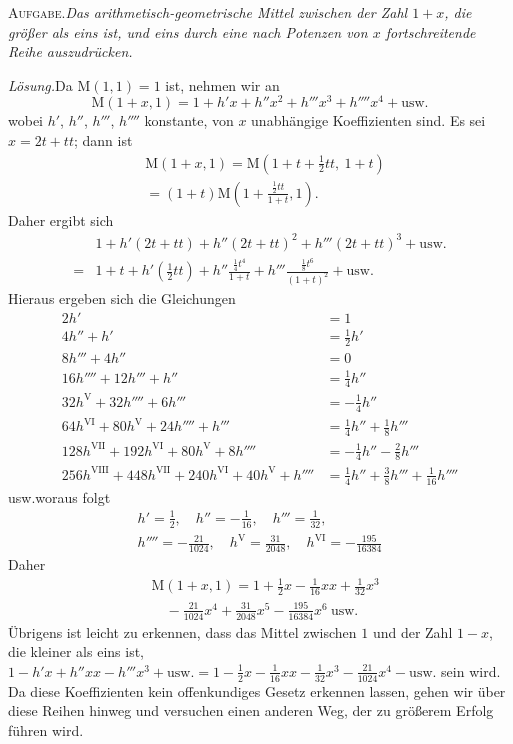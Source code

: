 \begingroup
\renewcommand{\arraystretch}{1.45}

\textsc{Aufgabe.}\quad \textit{Das arithmetisch-geometrische Mittel zwischen der Zahl $1+x$, die größer als eins ist, und eins durch eine nach Potenzen von $x$ fortschreitende Reihe auszudrücken.}

\textit{Lösung.}\quad Da $\mathrm M(1,1)=1$ ist, nehmen wir an
\[
\mathrm M(1+x,1)=1+h'x+h''x^2+h'''x^3+h''''x^4+\text{usw.}
\]
wobei $h'$, $h''$, $h'''$, $h''''$ konstante, von $x$ unabhängige Koeffizienten sind.
Es sei $x=2t+tt$; dann ist
\[
\begin{aligned}&\mathrm M(1+x,1)=\mathrm M(1+t+\tfrac12tt,\ 1+t)\\&=(1+t)\mathrm M(1+\frac{\tfrac12tt}{1+t},1).\end{aligned}
\]
Daher ergibt sich
\[
\begin{aligned}
&1+h'(2t+tt)+h''(2t+tt)^2+h'''(2t+tt)^3+\text{usw.}\\[6pt]
={}&1+t+h'(\tfrac12tt)+h''\frac{\tfrac14t^4}{1+t}+h'''\frac{\tfrac18t^6}{(1+t)^2}+\text{usw.}
\end{aligned}
\]
Hieraus ergeben sich die Gleichungen
\[
\begin{aligned}
2h'&=1\\[6pt]
4h''+h'&=\tfrac12h'\\[6pt]
8h'''+4h''&=0\\[6pt]
16h''''+12h'''+h''&=\tfrac14h''\\[6pt]
32h^{\mathrm V}+32h''''+6h'''&=-\tfrac14h''\\[6pt]
64h^{\mathrm{VI}}+80h^{\mathrm V}+24h''''+h'''&=\tfrac14h''+\tfrac18h'''\\[6pt]
128h^{\mathrm{VII}}+192h^{\mathrm{VI}}+80h^{\mathrm V}+8h''''&=-\tfrac14h''-\tfrac28h'''\\[6pt]
256h^{\mathrm{VIII}}+448h^{\mathrm{VII}}+240h^{\mathrm{VI}}+40h^{\mathrm V}+h''''&=\tfrac14h''+\tfrac38h'''+\tfrac1{16}h''''
\end{aligned}
\]
usw.\quad woraus folgt
\[
\begin{gathered}h'=\tfrac12,\quad h''=-\tfrac1{16},\quad h'''=\tfrac1{32},\\ h''''=-\tfrac{21}{1024},\quad h^{\mathrm V}=\tfrac{31}{2048},\quad h^{\mathrm{VI}}=-\tfrac{195}{16384}\end{gathered}
\]
Daher
\[
\begin{aligned}&\mathrm M(1+x,1)=1+\tfrac12x-\tfrac1{16}xx+\tfrac1{32}x^3\\&\quad-\tfrac{21}{1024}x^4+\tfrac{31}{2048}x^5-\tfrac{195}{16384}x^6\ \text{usw.}\end{aligned}
\]
Übrigens ist leicht zu erkennen, dass das Mittel zwischen $1$ und der Zahl
\(1-x\), die kleiner als eins ist, \(1-h'x+h''xx-h'''x^3+\text{usw.}=1-\frac12x-\frac1{16}xx-\frac1{32}x^3-\frac{21}{1024}x^4-\text{usw.}\) sein wird.
Da diese Koeffizienten kein offenkundiges Gesetz erkennen lassen, gehen wir über diese Reihen hinweg
und versuchen einen anderen Weg, der zu größerem Erfolg führen wird.

